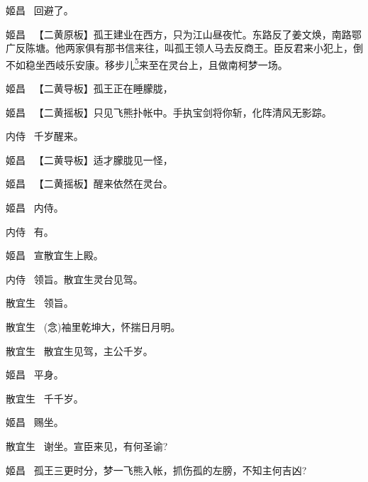 {姬昌\hspace{30pt}~ 回避了。

\setlength{\hangindent}{60pt}   %
{姬昌\hspace{30pt}~ 【{\akai 二黄原板}】孤王建业在西方，只为江山昼夜忙。东路反了姜文焕，南路鄂广反陈塘。他两家俱有那书信来往，叫孤王领人马去反商王。臣反君来小犯上，倒不如稳坐西岐乐安康。移步儿\protect\hyperlink{fn5}{\textsuperscript{5}}来至在灵台上，且做南柯梦一场。}

姬昌\hspace{30pt}~ 【{\akai 二黄导板}】孤王正在睡朦胧，

	姬昌\hspace{30pt}~ 【{\akai 二黄摇板}】只见飞熊扑帐中。手执宝剑将你斩，化阵清风无影踪。

内侍\hspace{30pt}~ 千岁醒来。

姬昌 \hspace{30pt}~【{\akai 二黄导板}】适才朦胧见一怪，

	姬昌 \hspace{30pt}~【{\akai 二黄摇板}】醒来依然在灵台。

姬昌\hspace{30pt}~ 内侍。

内侍\hspace{30pt}~ 有。

姬昌\hspace{30pt}~ 宣散宜生上殿。

内侍\hspace{30pt}~ 领旨。散宜生灵台见驾。

散宜生\hspace{20pt}~ 领旨。

散宜生\hspace{20pt}~ ({\akai 念})袖里乾坤大，怀揣日月明。

散宜生 \hspace{20pt}~散宜生见驾，主公千岁。

姬昌\hspace{30pt}~ 平身。

散宜生\hspace{20pt}~ 千千岁。

姬昌\hspace{30pt}~ 赐坐。

散宜生\hspace{20pt}~ 谢坐。宣臣来见，有何圣谕?

姬昌\hspace{30pt}~ 孤王三更时分，梦一飞熊入帐，抓伤孤的左膀，不知主何吉凶?

}

